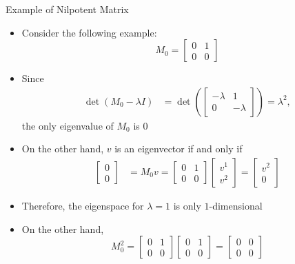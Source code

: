 \documentclass[usenames,dvipsnames,10pt]{beamer}
\begin{document}
\begin{frame}
  {Example of Nilpotent Matrix}

  \begin{itemize}
  \item Consider the following example:
    \[ M_0 =
      \begin{bmatrix}
        0 & 1 \\ 0 & 0
      \end{bmatrix}
    \]
  \item Since
    \begin{align*}
      \det(M_0-\lambda I) &= \det
                            \left(\begin{bmatrix}
                                    -\lambda & 1 \\ 0 & -\lambda
                                  \end{bmatrix}\right)
                            = \lambda^2,
    \end{align*}
    the only eigenvalue of $M_0$ is $0$
  \item On the other hand, $v$ is an eigenvector if and only if
    \begin{align*}
      \begin{bmatrix}0 \\ 0 \end{bmatrix} &= M_0v
                                            = \begin{bmatrix} 0 & 1 \\ 0 & 0 \end{bmatrix}\begin{bmatrix} v^1 \\ v^2\end{bmatrix} =\begin{bmatrix} v^2 \\ 0 \end{bmatrix}
    \end{align*}
  \item Therefore, the eigenspace for $\lambda = 1$ is only $1$-dimensional
  \item On the other hand,
    \[ M_0^2 = \begin{bmatrix} 0 & 1 \\ 0 & 0 \end{bmatrix}\begin{bmatrix} 0 & 1 \\ 0 & 0 \end{bmatrix} = \begin{bmatrix} 0 & 0 \\ 0 & 0 \end{bmatrix} \]
  \end{itemize}
\end{frame}
\end{document}
